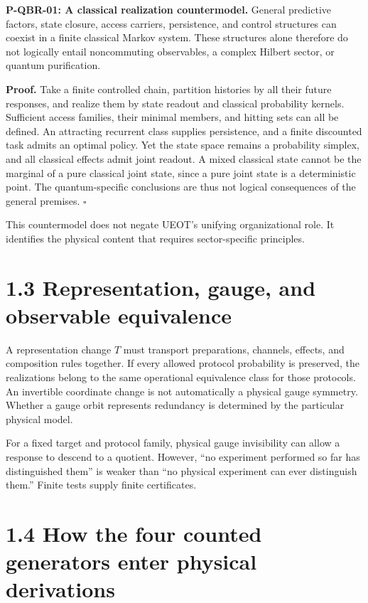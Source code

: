 \documentclass[
  11pt,
  oneside]{book}
\begin{document}
\label{p-qbr-01}{}

\textbf{P-QBR-01: A classical realization countermodel.} General
predictive factors, state closure, access carriers, persistence, and
control structures can coexist in a finite classical Markov system.
These structures alone therefore do not logically entail noncommuting
observables, a complex Hilbert sector, or quantum purification.

\textbf{Proof.} Take a finite controlled chain, partition histories by
all their future responses, and realize them by state readout and
classical probability kernels. Sufficient access families, their minimal
members, and hitting sets can all be defined. An attracting recurrent
class supplies persistence, and a finite discounted task admits an
optimal policy. Yet the state space remains a probability simplex, and
all classical effects admit joint readout. A mixed classical state
cannot be the marginal of a pure classical joint state, since a pure
joint state is a deterministic point. The quantum-specific conclusions
are thus not logical consequences of the general premises. \(\square\)

This countermodel does not negate UEOT's unifying organizational role.
It identifies the physical content that requires sector-specific
principles.

\section{1.3 Representation, gauge, and observable equivalence}

A representation change \(T\) must transport preparations, channels,
effects, and composition rules together. If every allowed protocol
probability is preserved, the realizations belong to the same
operational equivalence class for those protocols. An invertible
coordinate change is not automatically a physical gauge symmetry.
Whether a gauge orbit represents redundancy is determined by the
particular physical model.

For a fixed target and protocol family, physical gauge invisibility can
allow a response to descend to a quotient. However, ``no experiment
performed so far has distinguished them'' is weaker than ``no physical
experiment can ever distinguish them.'' Finite tests supply finite
certificates.

\section{1.4 How the four counted generators enter physical derivations}
\end{document}
